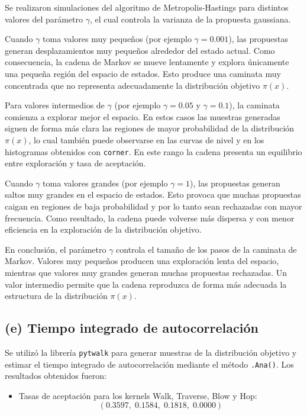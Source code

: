 \documentclass[12pt,spanish,mexico]{article}
\numberwithin{equation}{section}
\theoremstyle{definition}
\theoremstyle{remark}
\begin{document}
\begin{enumerate}[label=(\alph*)]
Se realizaron simulaciones del algoritmo de Metropolis-Hastings para distintos valores del parámetro $\gamma$, el cual controla la varianza de la propuesta gaussiana.

Cuando $\gamma$ toma valores muy pequeños (por ejemplo $\gamma = 0.001$), las propuestas generan desplazamientos muy pequeños alrededor del estado actual. Como consecuencia, la cadena de Markov se mueve lentamente y explora únicamente una pequeña región del espacio de estados. Esto produce una caminata muy concentrada que no representa adecuadamente la distribución objetivo $\pi(x)$.

Para valores intermedios de $\gamma$ (por ejemplo $\gamma = 0.05$ y $\gamma = 0.1$), la caminata comienza a explorar mejor el espacio. En estos casos las muestras generadas siguen de forma más clara las regiones de mayor probabilidad de la distribución $\pi(x)$, lo cual también puede observarse en las curvas de nivel y en los histogramas obtenidos con \texttt{corner}. En este rango la cadena presenta un equilibrio entre exploración y tasa de aceptación.

Cuando $\gamma$ toma valores grandes (por ejemplo $\gamma = 1$), las propuestas generan saltos muy grandes en el espacio de estados. Esto provoca que muchas propuestas caigan en regiones de baja probabilidad y por lo tanto sean rechazadas con mayor frecuencia. Como resultado, la cadena puede volverse más dispersa y con menor eficiencia en la exploración de la distribución objetivo.

En conclusión, el parámetro $\gamma$ controla el tamaño de los pasos de la caminata de Markov. Valores muy pequeños producen una exploración lenta del espacio, mientras que valores muy grandes generan muchas propuestas rechazadas. Un valor intermedio permite que la cadena reproduzca de forma más adecuada la estructura de la distribución $\pi(x)$.

    \subsection*{(e) Tiempo integrado de autocorrelación}

Se utilizó la librería \texttt{pytwalk} para generar muestras de la distribución objetivo y estimar el tiempo integrado de autocorrelación mediante el método \texttt{.Ana()}. Los resultados obtenidos fueron:

\begin{itemize}
    \item Tasas de aceptación para los kernels Walk, Traverse, Blow y Hop:
    \[
    (0.3597,\; 0.1584,\; 0.1818,\; 0.0000)
    \]


\end{itemize}
\end{enumerate}
\end{document}
